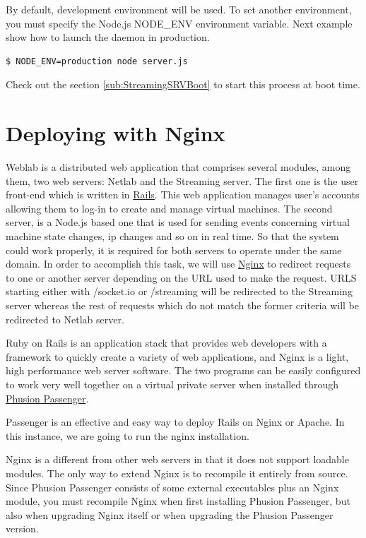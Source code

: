 \documentclass{article}
\begin{document}
By default, development environment will be used. To set another environment, you must specify the Node.js NODE\_ENV environment variable. Next example show how to launch the daemon in production.

\begin{verbatim}
$ NODE_ENV=production node server.js
\end{verbatim}

Check out the section \ref{sub:StreamingSRVBoot} to start this process at boot time.

\section{Deploying with Nginx}
\label{sec:NGINX}

Weblab is a distributed web application that comprises several modules, among them, two web servers: Netlab and the Streaming server. The first one is the user front-end which is written in \href{http://rubyonrails.org/}{Rails}. This web application manages user's accounts allowing them to log-in to create and manage virtual machines. The second server, is a Node.js based one that is used for sending events concerning virtual machine state changes, ip changes and so on in real time. So that the system could work properly, it is required for both servers to operate under the same domain. In order to accomplish this task, we will use \href{http://nginx.org/}{Nginx} to redirect requests to one or another server depending on the URL used to make the request. URLS starting either with /socket.io or /streaming will be redirected to the Streaming server whereas the rest of requests which do not match the former criteria will be redirected to Netlab server.

Ruby on Rails is an application stack that provides web developers with a framework to quickly create a variety of web applications, and Nginx is a light, high performance web server software. The two programs can be easily configured to work very well together on a virtual private server when installed through \href{www.phusionpassenger.com}{Phusion Passenger}.

Passenger is an effective and easy way to deploy Rails on Nginx or Apache. In this instance, we are going to run the nginx installation. 

Nginx is a different from other web servers in that it does not support loadable modules. The only way to extend Nginx is to recompile it entirely from source. Since Phusion Passenger consists of some external executables plus an Nginx module, you must recompile Nginx when first installing Phusion Passenger, but also when upgrading Nginx itself or when upgrading the Phusion Passenger version.
\end{document}
